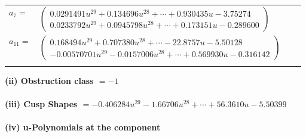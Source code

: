 \documentclass[1p]{elsarticle_modified}
\theoremstyle{definition}
\begin{document}
\begin{tabular}{m{7pt} m{180pt} m{7pt} m{180pt} }
\flushright $a_{7}=$&$\begin{pmatrix}0.0291491 u^{29}+0.134696 u^{28}+\cdots+0.930435 u-3.75274\\0.0233792 u^{29}+0.0945798 u^{28}+\cdots+0.173151 u-0.289600\end{pmatrix}$ \\
\flushright $a_{11}=$&$\begin{pmatrix}0.168494 u^{29}+0.707380 u^{28}+\cdots-22.8757 u-5.50128\\-0.00570701 u^{29}-0.0157006 u^{28}+\cdots+0.569930 u-0.316142\end{pmatrix}$\\&\end{tabular}
\flushleft \textbf{(ii) Obstruction class $= -1$}\\~\\
\flushleft \textbf{(iii) Cusp Shapes $= -0.406284 u^{29}-1.66706 u^{28}+\cdots+56.3610 u-5.50399$}\\~\\
\newpage\renewcommand{\arraystretch}{1}
\flushleft \textbf{(iv) u-Polynomials at the component}\newline \\
\end{document}
